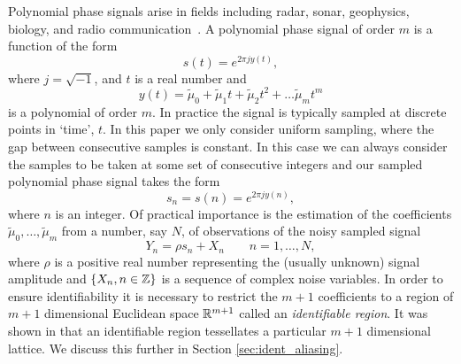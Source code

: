 \documentclass[journal]{IEEEtran}
\begin{document}
Polynomial phase signals arise in fields including radar, sonar, geophysics, biology, and radio communication~\cite{Hlawatsch_lin_quad_time_freq_spmag_1992,Ridleyspeechpolyphase1989, Suga_1975_bats_echolocation, Moss_2005echolocation,Angeby_estimating_2000}. %
A polynomial phase signal of order $m$ is a function of the form
\[
s(t) = e^{2\pi j y(t)},
\]
where $j = \sqrt{-1}$, and $t$ is a real number and 
\[
y(t) = \tilde{\mu}_0 +\tilde{\mu}_1 t + \tilde{\mu}_2 t^2 + \dots \tilde{\mu}_m t^m
\]
is a polynomial of order $m$.  In practice the signal is typically sampled at discrete points in `time', $t$. In this paper we only consider uniform sampling, where the gap between consecutive samples is constant. In this case we can always consider the samples to be taken at some set of consecutive integers and our sampled polynomial phase signal takes the form
\[
s_n = s(n) = e^{2\pi j y(n)},
\] 
where $n$ is an integer.  Of practical importance is the estimation of the coefficients $\tilde{\mu}_0, \dots, \tilde{\mu}_m$ from a number, say $N$, of observations of the noisy sampled signal
\begin{equation}\label{eq:Y_nsamplednoisey}
Y_n = \rho s_n + X_n \qquad n = 1, \dots, N,
\end{equation}
where $\rho$ is a positive real number representing the (usually unknown) signal amplitude and $\{X_n, n \in {\mathbb Z}\}$ is a sequence of complex noise variables. In order to ensure identifiability it is necessary to restrict the $m+1$ coefficients to a region of $m+1$ dimensional Euclidean space ${\mathbb R}^{m+1}$ called an \emph{identifiable region}.  It was shown in \cite{McKilliam2009IndentifiabliltyAliasingPolyphase} that an identifiable region tessellates a particular $m+1$ dimensional lattice.  We discuss this further in Section \ref{sec:ident_aliasing}.
\end{document}
